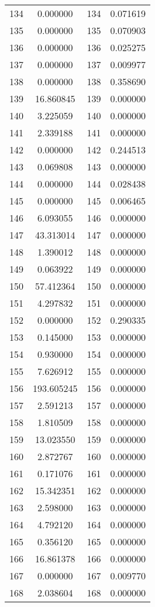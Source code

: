 \documentclass[12pt]{article}
\begin{document}
\begin{longtable}{@{}cccc@{}}
134 & 0.000000 & 134 & 0.071619 \\
135 & 0.000000 & 135 & 0.070903 \\
136 & 0.000000 & 136 & 0.025275 \\
137 & 0.000000 & 137 & 0.009977 \\
138 & 0.000000 & 138 & 0.358690 \\
139 & 16.860845 & 139 & 0.000000 \\
140 & 3.225059 & 140 & 0.000000 \\
141 & 2.339188 & 141 & 0.000000 \\
142 & 0.000000 & 142 & 0.244513 \\
143 & 0.069808 & 143 & 0.000000 \\
144 & 0.000000 & 144 & 0.028438 \\
145 & 0.000000 & 145 & 0.006465 \\
146 & 6.093055 & 146 & 0.000000 \\
147 & 43.313014 & 147 & 0.000000 \\
148 & 1.390012 & 148 & 0.000000 \\
149 & 0.063922 & 149 & 0.000000 \\
150 & 57.412364 & 150 & 0.000000 \\
151 & 4.297832 & 151 & 0.000000 \\
152 & 0.000000 & 152 & 0.290335 \\
153 & 0.145000 & 153 & 0.000000 \\
154 & 0.930000 & 154 & 0.000000 \\
155 & 7.626912 & 155 & 0.000000 \\
156 & 193.605245 & 156 & 0.000000 \\
157 & 2.591213 & 157 & 0.000000 \\
158 & 1.810509 & 158 & 0.000000 \\
159 & 13.023550 & 159 & 0.000000 \\
160 & 2.872767 & 160 & 0.000000 \\
161 & 0.171076 & 161 & 0.000000 \\
162 & 15.342351 & 162 & 0.000000 \\
163 & 2.598000 & 163 & 0.000000 \\
164 & 4.792120 & 164 & 0.000000 \\
165 & 0.356120 & 165 & 0.000000 \\
166 & 16.861378 & 166 & 0.000000 \\
167 & 0.000000 & 167 & 0.009770 \\
168 & 2.038604 & 168 & 0.000000 \\

\end{longtable}
\end{document}
